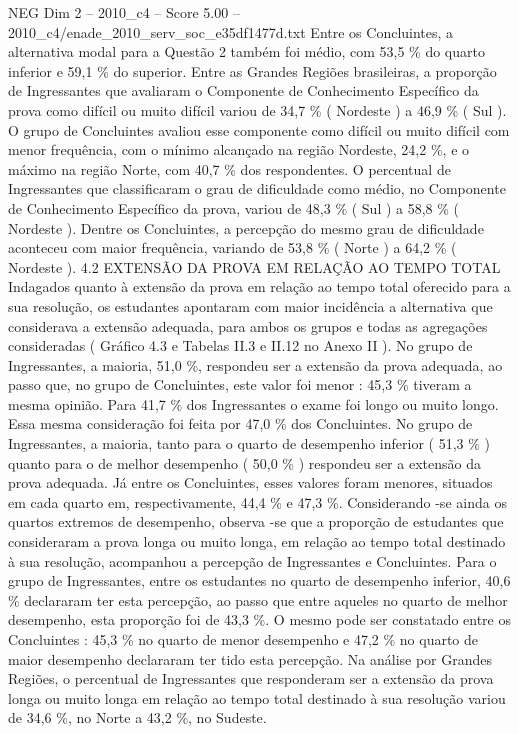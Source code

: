 \begin{textsample}{NEG Dim 2 – 2010\_c4 – Score 5.00 – 2010\_c4/enade\_2010\_serv\_soc\_e35df1477d.txt}
Entre os Concluintes, a alternativa modal para a Questão 2 também foi médio, com 53,5 \% do quarto inferior e 59,1 \% do superior.
Entre as Grandes Regiões brasileiras, a proporção de Ingressantes que avaliaram o Componente de Conhecimento Específico da prova como difícil ou muito difícil variou de 34,7 \% ( Nordeste ) a 46,9 \% ( Sul ).
O grupo de Concluintes avaliou esse componente como difícil ou muito difícil com menor frequência, com o mínimo alcançado na região Nordeste, 24,2 \%, e o máximo na região Norte, com 40,7 \% dos respondentes.
O percentual de Ingressantes que classificaram o grau de dificuldade como médio, no Componente de Conhecimento Específico da prova, variou de 48,3 \% ( Sul ) a 58,8 \% ( Nordeste ).
Dentre os Concluintes, a percepção do mesmo grau de dificuldade aconteceu com maior frequência, variando de 53,8 \% ( Norte ) a 64,2 \% ( Nordeste ). 4.2 EXTENSÃO DA PROVA EM RELAÇÃO AO TEMPO TOTAL Indagados quanto à extensão da prova em relação ao tempo total oferecido para a sua resolução, os estudantes apontaram com maior incidência a alternativa que considerava a extensão adequada, para ambos os grupos e todas as agregações consideradas ( Gráfico 4.3 e Tabelas II.3 e II.12 no Anexo II ).
No grupo de Ingressantes, a maioria, 51,0 \%, respondeu ser a extensão da prova adequada, ao passo que, no grupo de Concluintes, este valor foi menor : 45,3 \% tiveram a mesma opinião.
Para 41,7 \% dos Ingressantes o exame foi longo ou muito longo.
Essa mesma consideração foi feita por 47,0 \% dos Concluintes.
No grupo de Ingressantes, a maioria, tanto para o quarto de desempenho inferior ( 51,3 \% ) quanto para o de melhor desempenho ( 50,0 \% ) respondeu ser a extensão da prova adequada.
Já entre os Concluintes, esses valores foram menores, situados em cada quarto em, respectivamente, 44,4 \% e 47,3 \%.
Considerando -se ainda os quartos extremos de desempenho, observa -se que a proporção de estudantes que consideraram a prova longa ou muito longa, em relação ao tempo total destinado à sua resolução, acompanhou a percepção de Ingressantes e Concluintes.
Para o grupo de Ingressantes, entre os estudantes no quarto de desempenho inferior, 40,6 \% declararam ter esta percepção, ao passo que entre aqueles no quarto de melhor desempenho, esta proporção foi de 43,3 \%.
O mesmo pode ser constatado entre os Concluintes : 45,3 \% no quarto de menor desempenho e 47,2 \% no quarto de maior desempenho declararam ter tido esta percepção.
Na análise por Grandes Regiões, o percentual de Ingressantes que responderam ser a extensão da prova longa ou muito longa em relação ao tempo total destinado à sua resolução variou de 34,6 \%, no Norte a 43,2 \%, no Sudeste.

\end{textsample}
